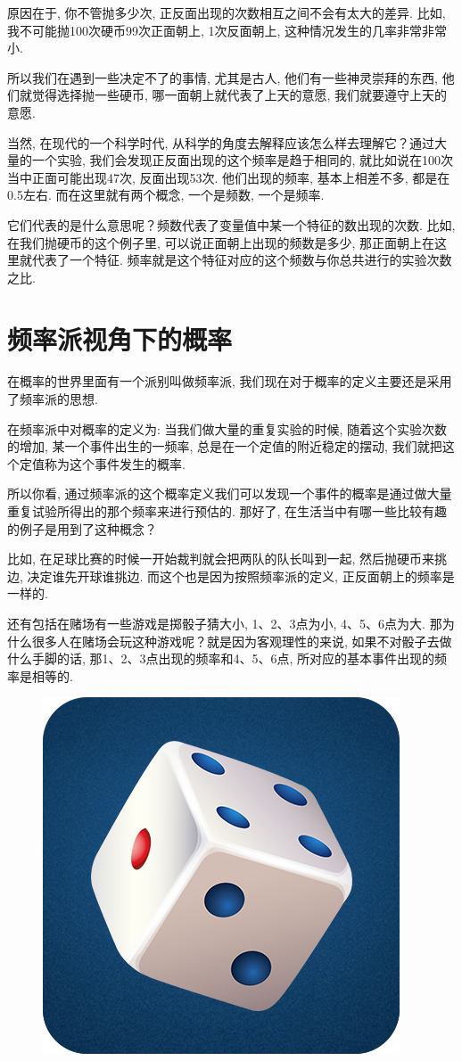 原因在于, 你不管抛多少次, 正反面出现的次数相互之间不会有太大的差异. 比如, 我不可能抛100次硬币99次正面朝上, 1次反面朝上, 这种情况发生的几率非常非常小. 

所以我们在遇到一些决定不了的事情, 尤其是古人, 他们有一些神灵崇拜的东西, 他们就觉得选择抛一些硬币, 哪一面朝上就代表了上天的意愿, 我们就要遵守上天的意愿. 

当然, 在现代的一个科学时代, 从科学的角度去解释应该怎么样去理解它？通过大量的一个实验, 我们会发现正反面出现的这个频率是趋于相同的, 就比如说在100次当中正面可能出现47次, 反面出现53次. 他们出现的频率, 基本上相差不多, 都是在0.5左右. 而在这里就有两个概念, 一个是频数, 一个是频率. 

它们代表的是什么意思呢？频数代表了变量值中某一个特征的数出现的次数. 比如, 在我们抛硬币的这个例子里, 可以说正面朝上出现的频数是多少, 那正面朝上在这里就代表了一个特征. 频率就是这个特征对应的这个频数与你总共进行的实验次数之比. 

\section{频率派视角下的概率}

在概率的世界里面有一个派别叫做频率派, 我们现在对于概率的定义主要还是采用了频率派的思想. 

在频率派中对概率的定义为: 当我们做大量的重复实验的时候, 随着这个实验次数的增加, 某一个事件出生的一频率, 总是在一个定值的附近稳定的摆动, 我们就把这个定值称为这个事件发生的概率. 

所以你看, 通过频率派的这个概率定义我们可以发现一个事件的概率是通过做大量重复试验所得出的那个频率来进行预估的. 那好了, 在生活当中有哪一些比较有趣的例子是用到了这种概念？

比如, 在足球比赛的时候一开始裁判就会把两队的队长叫到一起, 然后抛硬币来挑边, 决定谁先开球谁挑边. 而这个也是因为按照频率派的定义, 正反面朝上的频率是一样的. 

还有包括在赌场有一些游戏是掷骰子猜大小, 1、2、3点为小, 4、5、6点为大. 那为什么很多人在赌场会玩这种游戏呢？就是因为客观理性的来说, 如果不对骰子去做什么手脚的话, 那1、2、3点出现的频率和4、5、6点, 所对应的基本事件出现的频率是相等的. 

\begin{figure}[ht]
  \centering
  \includegraphics[width=0.3\linewidth]{asset/20230916012942.png}
  \caption{}
  \label{fig:img20_2}
\end{figure}

